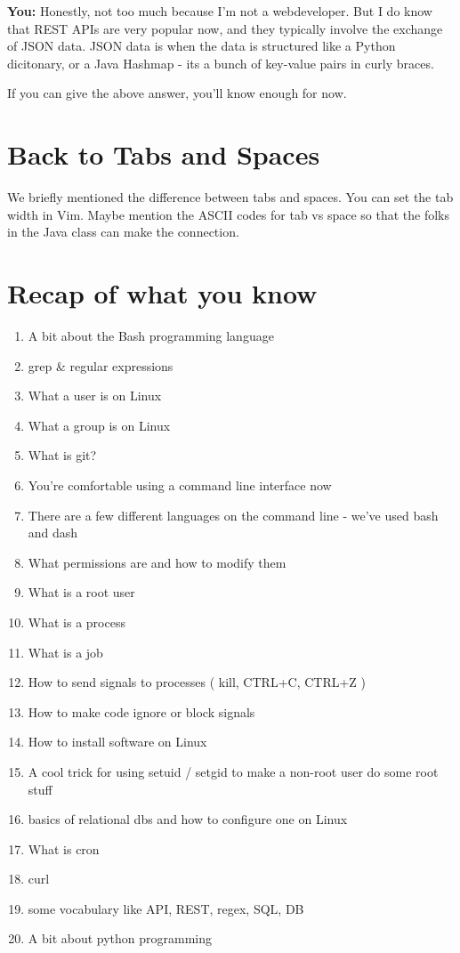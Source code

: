 \documentclass[10pt]{article}
\begin{document}
\noindent \textbf{You: } Honestly, not too much because I'm not a webdeveloper. But I do know that REST APIs are very popular now, and they typically involve the exchange of JSON data. JSON data is when the data is structured like a Python dicitonary, or a Java Hashmap  - its a bunch of key-value pairs in curly braces.

If you can give the above answer, you'll know enough for now.

\section{Back to Tabs and Spaces}
We briefly mentioned the difference between tabs and spaces. You can set the tab width in Vim. Maybe mention the ASCII codes for tab vs space so that the folks in the Java class can make the connection.

\section{Recap of what you know}
\begin{enumerate}
\item A bit about the Bash programming language
\item grep \& regular expressions
\item What a user is on Linux
\item What a group is on Linux
\item What is git?
\item You're comfortable using a command line interface now
\item There are a few different languages on the command line - we've used bash and dash
\item What permissions are and how to modify them
\item What is a root user
\item What is a process
\item What is a job
\item How to send signals to processes ( kill, CTRL+C, CTRL+Z )
\item How to make code ignore or block signals
\item How to install software on Linux
\item A cool trick for using setuid / setgid to make a non-root user do some root stuff
\item basics of relational dbs and how to configure one on Linux
\item What is cron
\item curl
\item some vocabulary like API, REST, regex, SQL, DB
\item A bit about python programming
\end{enumerate}
\end{document}
